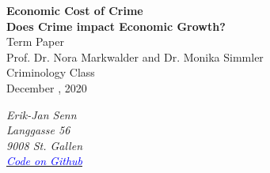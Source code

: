 \documentclass[a4paper,12pt]{article}
\begin{document}



\begin{titlepage}       %

\thispagestyle{empty}   %


\begin{center}
\vspace*{2.5cm}
{\bf  \Large   Economic Cost of Crime }\\
\vspace*{1cm} 
{\bf  \Large   Does Crime impact Economic Growth?}\\
\vspace*{3cm} 
Term Paper\\
Prof. Dr. Nora Markwalder and Dr. Monika Simmler
\\ Criminology Class\\

\vspace*{0.5cm} 
December , 2020\\
\end{center}

\vfill
\begin{flushright}
   \emph{Erik-Jan Senn} \\
    \emph{Langgasse 56}\\
    \emph{9008 St. Gallen}\\
    \emph{\href{https://github.com/DrWatson42/crime_on_gdp}{\textcolor{blue}{Code on Github} }}

\end{flushright}



% 
% 
% 

\end{titlepage}

\newpage                %




\end{document}
